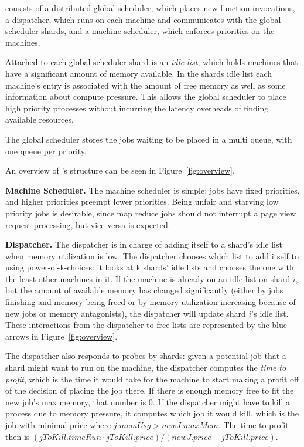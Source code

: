 \sys{} consists of a distributed global scheduler, which places new function
invocations, a dispatcher, which runs on each machine and communicates with the
global scheduler shards, and a machine scheduler, which enforces priorities on
the machines.

Attached to each global scheduler shard is an \textit{idle list}, which holds
machines that have a significant amount of memory available. In the shards idle
list each machine's entry is associated with the amount of free memory as well
as some information about compute pressure. This allows the global scheduler to
place high priority processes without incurring the latency overheads of finding
available resources.

The global scheduler stores the jobs waiting to be placed in a multi queue, with
one queue per priority.

An overview of \sys{}'s structure can be seen in Figure\ \ref{fig:overview}.


\textbf{Machine Scheduler.}
The machine scheduler is simple: jobs have fixed priorities, and higher
priorities preempt lower priorities. Being unfair and starving low priority
jobs is desirable, since map reduce jobs should not interrupt a page view
request processing, but vice versa is expected.


\textbf{Dispatcher.}
The dispatcher is in charge of adding itself to a shard's idle list when memory
utilization is low. The dispatcher chooses which list to add itself to using
power-of-k-choices: it looks at k shards' idle lists and chooses the one with
the least other machines in it. If the machine is already on an idle list on
shard $i$, but the amount of available memory has changed significantly (either
by jobs finishing and memory being freed or by memory utilization increasing
because of new jobs or memory antagonists), the dispatcher will update shard
$i$'s idle list. These interactions from the dispatcher to free lists are
represented by the blue arrows in Figure\ \ref{fig:overview}.

The dispatcher also responds to probes by shards: given a potential job that a
shard might want to run on the machine, the dispatcher computes the \textit{time
to profit}, which is the time it would take for the machine to start making a
profit off of the decision of placing the job there. If there is enough memory
free to fit the new job's max memory, that number is 0. If the dispatcher might
have to kill a process due to memory pressure, it computes which job it would
kill, which is the job with minimal price where $j.memUsg > newJ.maxMem$. The
time to profit then is $(jToKill.timeRun \cdot jToKill.price) / (newJ.price
- jToKill.price)$.

